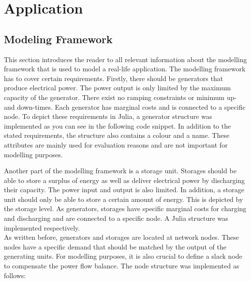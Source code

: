 \section{Application}


\subsection{Modeling Framework}
\label{sec:app:mod-framework}

This section introduces the reader to all relevant information about the modelling framework that is used to model a real-life application. The modelling framework has to cover certain requirements. Firstly, there should be generators that produce electrical power. The power output is only limited by the maximum capacity of the generator. There exist no ramping constraints or minimum up- and down-times. Each generator has marginal costs and is connected to a specific node. To depict these requirements in Julia, a generator structure was implemented as you can see in the following code snippet. In addition to the stated requirements, the structure also contains a colour and a name. These attributes are mainly used for evaluation reasons and are not important for modelling purposes. 



Another part of the modelling framework is a storage unit. Storages should be able to store a surplus of energy as well as deliver electrical power by discharging their capacity. The power input and output is also limited. In addition, a storage unit should only be able to store a certain amount of energy. This is depicted by the storage level. As generators, storages have specific marginal costs for charging and discharging and are connected to a specific node. A Julia structure was implemented respectively.\\

As written before, generators and storages are located at network nodes. These nodes have a specific demand that should be matched by the output of the generating units. For modelling purposes, it is also crucial to define a slack node to compensate the power flow balance. The node structure was implemented as follows:



